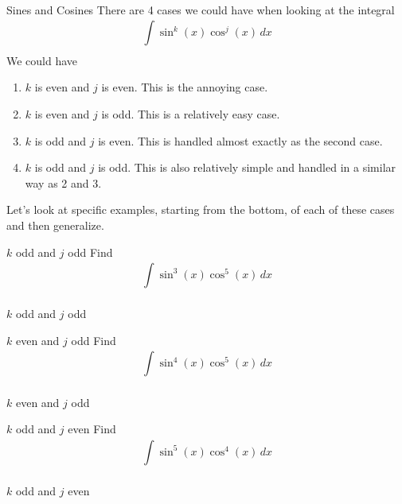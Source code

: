 \documentclass[presentation]{beamer}
\begin{document}
\begin{frame}[label={sec:orga7a5c1f}]{Sines and Cosines}
There are 4 cases we could have when looking at the integral
\[
\int\limits_{}^{} \sin^k \left( x \right) \cos^j \left( x \right)\,dx
\]
We could have
\begin{enumerate}
\item \(k\) is even and \(j\) is even.  This is the annoying case.
\item \(k\) is even and \(j\) is odd.  This is a relatively easy case.
\item \(k\) is odd and \(j\) is even. This is handled almost exactly as
the second case.
\item \(k\) is odd and \(j\) is odd. This is also relatively simple and
handled in a similar way as 2 and 3.
\end{enumerate}

Let's look at specific examples, starting from the bottom, of each of these cases and then
generalize.
\end{frame}

\begin{frame}[label={sec:org967d243}]{\(k\) odd and \(j\) odd}
Find
\[
\int\limits_{}^{} \sin^3 \left( x \right)\cos^5 \left( x \right)\,dx
\]
\vspace{10in}
\end{frame}

\begin{frame}[label={sec:orgf238fac}]{\(k\) odd and \(j\) odd}
\end{frame}

\begin{frame}[label={sec:orgada7d29}]{\(k\) even and \(j\) odd}
Find
\[
\int\limits_{}^{} \sin^4 \left( x \right)\cos^5 \left( x \right)\,dx
\]
\vspace{10in}
\end{frame}

\begin{frame}[label={sec:org790e68a}]{\(k\) even and \(j\) odd}
\end{frame}

\begin{frame}[label={sec:org9119866}]{\(k\) odd and \(j\) even}
Find
\[
\int\limits_{}^{} \sin^5 \left( x \right)\cos^4 \left( x \right)\,dx
\]
\vspace{10in}
\end{frame}

\begin{frame}[label={sec:org33597bb}]{\(k\) odd and \(j\) even}
\end{frame}
\end{document}

